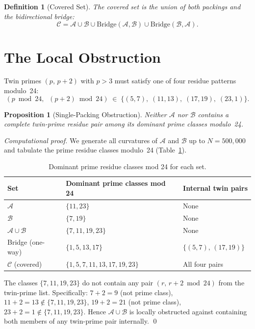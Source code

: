 \documentclass[12pt,a4paper]{article}
\newtheorem{proposition}{Proposition}
\newtheorem{definition}{Definition}
\theoremstyle{remark}
\begin{document}
\begin{definition}[Covered Set]
The \emph{covered set} is the union of both packings and the bidirectional
bridge:
\[
\mathcal{C} = \mathcal{A} \cup \mathcal{B}
\cup \text{Bridge}(\mathcal{A},\mathcal{B})
\cup \text{Bridge}(\mathcal{B},\mathcal{A}).
\]
\end{definition}

\section{The Local Obstruction}

Twin primes $(p,\,p+2)$ with $p > 3$ must satisfy one of four residue
patterns modulo~24:
\[
(p \bmod 24,\;\; (p{+}2) \bmod 24) \;\in\;
\{(5,7),\; (11,13),\; (17,19),\; (23,1)\}.
\]

\begin{proposition}[Single-Packing Obstruction]
\label{prop:obstruction}
Neither $\mathcal{A}$ nor $\mathcal{B}$ contains a complete twin-prime
residue pair among its dominant prime classes modulo~24.
\end{proposition}

\begin{proof}[Computational proof]
We generate all curvatures of $\mathcal{A}$ and $\mathcal{B}$ up to
$N = 500{,}000$ and tabulate the prime residue classes modulo~24
(Table~\ref{tab:residues}).

\begin{table}[h]
\centering
\caption{Dominant prime residue classes mod 24 for each set.}
\label{tab:residues}
\begin{tabular}{lll}
\toprule
\textbf{Set} & \textbf{Dominant prime classes mod 24} & \textbf{Internal twin pairs} \\
\midrule
$\mathcal{A}$ & $\{11, 23\}$ & None \\
$\mathcal{B}$ & $\{7, 19\}$ & None \\
$\mathcal{A} \cup \mathcal{B}$ & $\{7, 11, 19, 23\}$ & None \\
Bridge (one-way) & $\{1, 5, 13, 17\}$ & $\{(5,7),\,(17,19)\}$ \\
$\mathcal{C}$ (covered) & $\{1, 5, 7, 11, 13, 17, 19, 23\}$ & All four pairs \\
\bottomrule
\end{tabular}
\end{table}

The classes $\{7,11,19,23\}$ do not contain any pair $(r,\,r{+}2\bmod 24)$
from the twin-prime list. Specifically: $7+2=9$ (not prime class),
$11+2=13\notin\{7,11,19,23\}$, $19+2=21$ (not prime class),
$23+2=1\notin\{7,11,19,23\}$.  Hence $\mathcal{A}\cup\mathcal{B}$ is
locally obstructed against containing both members of any twin-prime pair
internally. \qed
\end{proof}
\end{document}
